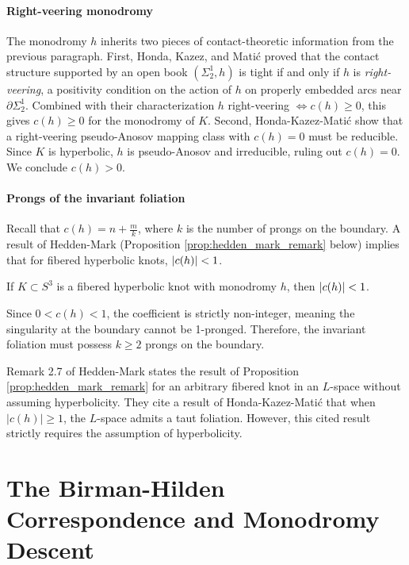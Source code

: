\paragraph{Right-veering monodromy} The monodromy $h$ inherits two pieces of contact-theoretic information from the previous paragraph. First, Honda, Kazez, and Matić \cite{honda2007right} proved that the contact structure supported by an open book $(\Sigma_2^1, h)$ is tight if and only if $h$ is \emph{right-veering}, a positivity condition on the action of $h$ on properly embedded arcs near $\partial \Sigma_2^1$. Combined with their characterization $h$ right-veering $\iff c(h) \ge 0$, this gives $c(h) \ge 0$ for the monodromy of $K$. Second, Honda-Kazez-Matić show that a right-veering pseudo-Anosov mapping class with $c(h) = 0$ must be reducible. Since $K$ is hyperbolic, $h$ is pseudo-Anosov and irreducible, ruling out $c(h) = 0$. We conclude $c(h) > 0$.

\paragraph{Prongs of the invariant foliation} Recall that $c(h) = n + \frac{m}{k}$, where $k$ is the number of prongs on the boundary. A result of Hedden-Mark (Proposition \ref{prop:hedden_mark_remark} below) implies that for fibered hyperbolic knots, $\abs{c(h)} < 1$.

\begin{prop}\label{prop:hedden_mark_remark}
    If $K \subset S^3$ is a fibered hyperbolic knot with monodromy $h$, then $\abs{c(h)} < 1$.
\end{prop}

Since $0 < c(h) < 1$, the coefficient is strictly non-integer, meaning the singularity at the boundary cannot be 1-pronged. Therefore, the invariant foliation must possess $k \ge 2$ prongs on the boundary.

\begin{remark}
    Remark 2.7 of Hedden-Mark states the result of Proposition \ref{prop:hedden_mark_remark} for an arbitrary fibered knot in an $L$-space without assuming hyperbolicity. They cite a result of Honda-Kazez-Mati\'{c} \cite{honda2007right} that when $|c(h)| \geq 1$, the $L$-space admits a taut foliation. However, this cited result strictly requires the assumption of hyperbolicity.
\end{remark}



\section{The Birman-Hilden Correspondence and Monodromy Descent} \label{section:Birman-Hilden}

